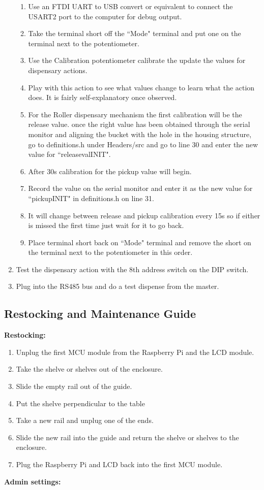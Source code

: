\documentclass[a4paper,11pt]{article}
\numberwithin{figure}{section}
\numberwithin{table}{section}
\begin{document}
\begin{appendices}
\begin{enumerate}
{\begin{enumerate}
  \item Use an FTDI UART to USB convert or equivalent to connect the USART2 port to the computer for debug output.
  \item Take the terminal short off the ``Mode" terminal and put one on the terminal next to the potentiometer.
  \item Use the Calibration potentiometer calibrate the update the values for dispensary actions. 
  \item Play with this action to see what values change to learn what the action does. It is fairly self-explanatory once observed.
  \item For the Roller dispensary mechanism the first calibration will be the release value. once the right value has been obtained through the serial monitor and aligning the bucket with the hole in the housing structure, go to definitions.h under Headers/src and go to line 30 and enter the new value for ``releasevalINIT".
  \item After 30s calibration for the pickup value will begin.
  \item Record the value on the serial monitor and enter it as the new value for ``pickupINIT" in definitions.h on line 31.
  \item It will change between release and pickup calibration every 15s so if either is missed the first time just wait for it to go back.
  \item Place terminal short back on ``Mode" terminal and remove the short on the terminal next to the potentiometer in this order.
  \end{enumerate}}
  \item Test the dispensary action with the 8th address switch on the DIP switch.
  \item Plug into the RS485 bus and do a test dispense from the master.
\end{enumerate}

\subsection{Restocking and Maintenance Guide}
\label{subsec:maintenace}
\textbf{Restocking:}
\begin{enumerate}
\item Unplug the first MCU module from the Raspberry Pi and the LCD module.
\item Take the shelve or shelves out of the enclosure.
\item Slide the empty rail out of the guide.
\item Put the shelve perpendicular to the table
\item Take a new rail and unplug one of the ends.
\item Slide the new rail into the guide and return the shelve or shelves to the enclosure.
\item Plug the Raspberry Pi and LCD back into the first MCU module.
\end{enumerate}
\textbf{Admin settings:}


\end{appendices}
\end{document}
